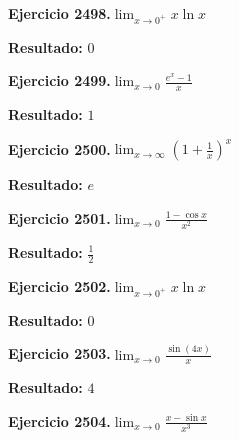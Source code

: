 \documentclass[10pt,a4paper]{article}
\begin{document}
\begin{ejbox}
\textbf{Ejercicio 2498.}\quad $\lim_{x\to 0^+} x\ln x$
\end{ejbox}

\begin{solbox}
\textbf{Resultado:} \(\displaystyle 0\)
\end{solbox}

\newpage
\begin{ejbox}
\textbf{Ejercicio 2499.}\quad $\lim_{x\to 0} \frac{e^x-1}{x}$
\end{ejbox}

\begin{solbox}
\textbf{Resultado:} \(\displaystyle 1\)
\end{solbox}

\begin{ejbox}
\textbf{Ejercicio 2500.}\quad $\lim_{x\to \infty} \left(1+\frac{1}{x}\right)^x$
\end{ejbox}

\begin{solbox}
\textbf{Resultado:} \(\displaystyle e\)
\end{solbox}

\begin{ejbox}
\textbf{Ejercicio 2501.}\quad $\lim_{x\to 0} \frac{1-\cos x}{x^2}$
\end{ejbox}

\begin{solbox}
\textbf{Resultado:} \(\displaystyle \frac{1}{2}\)
\end{solbox}

\newpage
\begin{ejbox}
\textbf{Ejercicio 2502.}\quad $\lim_{x\to 0^+} x\ln x$
\end{ejbox}

\begin{solbox}
\textbf{Resultado:} \(\displaystyle 0\)
\end{solbox}

\begin{ejbox}
\textbf{Ejercicio 2503.}\quad $\lim_{x\to 0} \frac{\sin(4x)}{x}$
\end{ejbox}

\begin{solbox}
\textbf{Resultado:} \(\displaystyle 4\)
\end{solbox}

\begin{ejbox}
\textbf{Ejercicio 2504.}\quad $\lim_{x\to 0} \frac{x-\sin x}{x^3}$
\end{ejbox}
\end{document}
